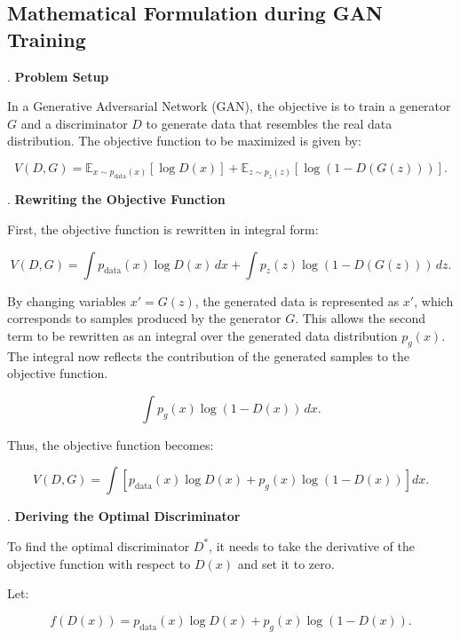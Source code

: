 \subsection{Mathematical Formulation during GAN Training}


. \textbf{Problem Setup}

In a Generative Adversarial Network (GAN), the objective is to train a generator \( G \) and a discriminator \( D \) 
to generate data that resembles the real data distribution. The objective function to be maximized is given by:

\begin{equation}
    V(D, G) = \mathbb{E}_{x \sim p_{\text{data}}(x)} [\log D(x)] + \mathbb{E}_{z \sim p_{z}(z)} [\log (1 - D(G(z)))].
\end{equation}

. \textbf{Rewriting the Objective Function}

First, the objective function is rewritten in integral form:

\begin{equation}
    V(D, G) = \int p_{\text{data}}(x) \log D(x) \, dx + \int p_{z}(z) \log (1 - D(G(z))) \, dz.
\end{equation}

By changing variables $x' = G(z)$, the generated data is represented as $x'$, which corresponds to samples produced by the generator $G$. This allows the second term to be rewritten as an integral over the generated data distribution $p_g(x)$. The integral now reflects the contribution of the generated samples to the objective function.

\begin{equation}
    \int p_g(x) \log (1 - D(x)) \, dx.
\end{equation}

Thus, the objective function becomes:

\begin{equation}
    V(D, G) = \int \left[ p_{\text{data}}(x) \log D(x) + p_g(x) \log (1 - D(x)) \right] dx.
\end{equation}

. \textbf{Deriving the Optimal Discriminator}

To find the optimal discriminator \( D^* \), it needs to take the derivative of the objective function with respect to \( D(x) \) and set it to zero.

Let:

\begin{equation}
    f(D(x)) = p_{\text{data}}(x) \log D(x) + p_g(x) \log (1 - D(x)).
\end{equation}

